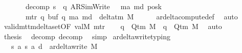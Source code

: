 \begin{isabellebody}
\ \ \ \ \ \ \ decomp{\isacharprime}{\kern0pt}{\isacharcolon}{\kern0pt}\ {\isachardoublequoteopen}s{\isacharprime}{\kern0pt}\ {\isacharequal}{\kern0pt}\ {\isacharparenleft}{\kern0pt}q{\isacharprime}{\kern0pt}{\isacharcomma}{\kern0pt}\ AR{\isacharunderscore}{\kern0pt}SimWrite{\isacharcomma}{\kern0pt}\ {}{\isacharcomma}{\kern0pt}\ {}{\isacharcomma}{\kern0pt}\ m{\isacharunderscore}{\kern0pt}a{\isacharprime}{\kern0pt}{\isacharcomma}{\kern0pt}\ m{\isacharunderscore}{\kern0pt}d{\isacharcomma}{\kern0pt}\ posk{\isacharparenright}{\kern0pt}{\isachardoublequoteclose}\isanewline
\ \ \ \ \ \ \ m{\isacharunderscore}{\kern0pt}tr{\isacharcolon}{\kern0pt}\ {\isachardoublequoteopen}{\isacharparenleft}{\kern0pt}q{\isacharcomma}{\kern0pt}\ buf{\isacharcomma}{\kern0pt}\ q{\isacharprime}{\kern0pt}{\isacharcomma}{\kern0pt}\ m{\isacharunderscore}{\kern0pt}a{\isacharprime}{\kern0pt}{\isacharcomma}{\kern0pt}\ m{\isacharunderscore}{\kern0pt}d{\isacharparenright}{\kern0pt}\ {\isasymin}\ delta{\isacharunderscore}{\kern0pt}tm\ M{\isachardoublequoteclose}\isanewline
\ \ \ \ \isamarkupfalse%
\ ar{\isacharunderscore}{\kern0pt}delta{\isacharunderscore}{\kern0pt}compute{\isacharunderscore}{\kern0pt}def\ \isamarkupfalse%
\ auto\isanewline
\ \ \isamarkupfalse%
\ valid{\isacharunderscore}{\kern0pt}mttm{\isacharunderscore}{\kern0pt}delta{\isacharunderscore}{\kern0pt}set{\isacharbrackleft}{\kern0pt}OF\ valM{\isacharbrackright}{\kern0pt}\ m{\isacharunderscore}{\kern0pt}tr\isanewline
\ \ \isamarkupfalse%
\ {\isachardoublequoteopen}q\ {\isasymin}\ Q{\isacharunderscore}{\kern0pt}tm\ M{\isachardoublequoteclose}\ \ {\isachardoublequoteopen}q{\isacharprime}{\kern0pt}\ {\isasymin}\ Q{\isacharunderscore}{\kern0pt}tm\ M{\isachardoublequoteclose}\ \isamarkupfalse%
\ auto\isanewline
\ \ \isamarkupfalse%
\ {\isacharquery}{\kern0pt}thesis\ \isamarkupfalse%
\ decomp\ decomp{\isacharprime}{\kern0pt}\ \isamarkupfalse%
\ simp\isanewline
{}\isamarkupfalse%
%
\endisatagproof
{\isafoldproof}%
%
\isadelimproof
\isanewline
%
\endisadelimproof
\isanewline
{}\isamarkupfalse%
\ ar{\isacharunderscore}{\kern0pt}delta{\isacharunderscore}{\kern0pt}write{\isacharunderscore}{\kern0pt}typing{\isacharcolon}{\kern0pt}\isanewline
\ \ \ {\isachardoublequoteopen}{\isacharparenleft}{\kern0pt}s{\isacharcomma}{\kern0pt}\ a{\isacharcomma}{\kern0pt}\ s{\isacharprime}{\kern0pt}{\isacharcomma}{\kern0pt}\ a{\isacharprime}{\kern0pt}{\isacharcomma}{\kern0pt}\ d{\isacharparenright}{\kern0pt}\ {\isasymin}\ ar{\isacharunderscore}{\kern0pt}delta{\isacharunderscore}{\kern0pt}write\ M{\isachardoublequoteclose}\isanewline

\end{isabellebody}
